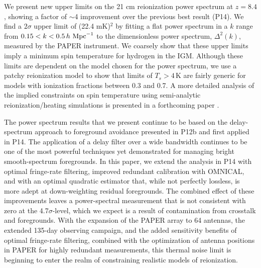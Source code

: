\documentclass[twocolumn,numberedappendix]{emulateapj} \shorttitle{New Limits on the 21 cm Power Spectrum at $z=8.4$}
\newcommand{\hMpci}{h\ {\rm Mpc}^{-1}}
\newcommand{\mKlimit}{(22.4 mK)$^2$ }
\begin{document}
We present new upper limits on the 21 cm reionization power spectrum at $z=8.4$,
showing a factor of $\sim$4 improvement over the previous best result (P14).
We find a $2\sigma$ upper limit of \mKlimit by fitting a
flat power spectrum in a $k$ range from $0.15<k<0.5\,\hMpci$ to the
dimensionless power spectrum, $\Delta^{2}(k)$, measured by the PAPER instrument. 
We coarsely show that these upper limits imply a minimum spin
temperature for hydrogen in the IGM.  Although these limits are dependent on
the model chosen for the power spectrum, we use a patchy reionization model
to show that limits of $T_s>4\,\textrm{K}$ are fairly generic for models with
ionization fractions between 0.3 and 0.7.
A more detailed analysis of the implied constraints on spin temperature using semi-analytic reionization/heating simulations is presented in a forthcoming paper \citep{pober_et_al2015}.

The power spectrum results that we present continue to be based on
the delay-spectrum approach to foreground avoidance presented in 
P12b and first applied in P14.  The application of a delay filter over
a wide bandwidth continues to be one of the most powerful techniques yet
demonstrated for managing bright smooth-spectrum foregrounds.  In this
paper, we extend the analysis in P14 with optimal fringe-rate filtering,
improved redundant calibration with OMNICAL, and with an optimal quadratic
estimator that, while not perfectly lossless, is more adept at down-weighting residual foregrounds.
The combined effect of these improvements leaves a power-spectral measurement that
is not consistent with zero at the 4.7$\sigma$-level, which we expect is a result of
contamination from crosstalk and foregrounds.
With the expansion of the PAPER array to 64 antennas, the extended 135-day
observing campaign,
and the added sensitivity benefits of optimal fringe-rate filtering, combined with
the optimization of antenna positions in PAPER for highly redundant
measurements, this thermal
noise limit is beginning to enter the realm of constraining realistic models of reionization.
\end{document}
